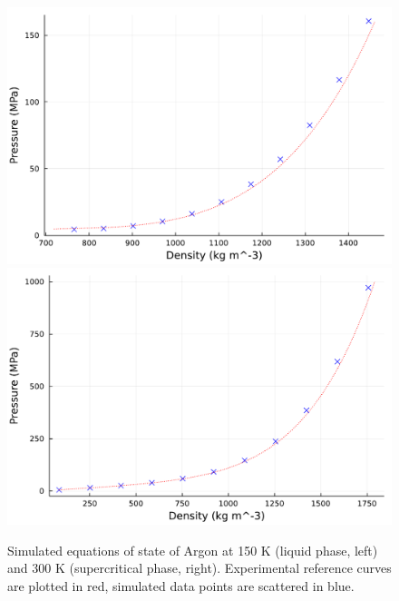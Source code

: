     \begin{figure}[htbp]
        \begin{center}
          \includegraphics[width=0.7\linewidth]{figures/chapter1/argon_nvt_150K.pdf}
          \includegraphics[width=0.7\linewidth]{figures/chapter1/argon_nvt_300K.pdf}
          \caption{ \label{fig:eos_argon}
            Simulated equations of state of Argon at 150 K (liquid phase, left) and 300 K (supercritical phase, right). Experimental reference curves are plotted in red, simulated data points are scattered in blue.
          }
        \end{center}
      \end{figure}

